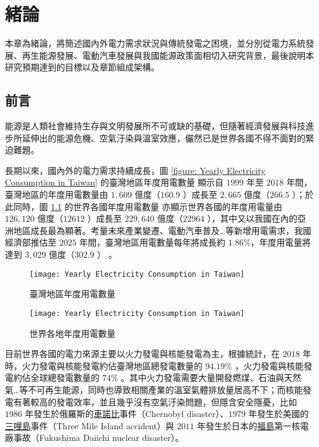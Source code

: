 
\chapter{緒論}

本章為緒論，將簡述國內外電力需求狀況與傳統發電之困境，並分別從電力系統發展、再生能源發展、電動汽車發展與我國能源政策面相切入研究背景，最後說明本研究預期達到的目標以及章節組成架構。

\section{前言}

能源是人類社會維持生存與文明發展所不可或缺的基礎，但隨著經濟發展與科技進步所延伸出的能源危機、空氣汙染與溫室效應，儼然已是世界各國不得不面對的緊迫難題。

長期以來，國內外的電力需求持續成長，圖 \ref{figure: Yearly Electricity Consumption in Taiwan} 的臺灣地區年度用電數量 \cite{boe-data} 顯示自 $1999$ 年至 $2018$ 年間，臺灣地區的年度用電數量由 $1,609$ 億度（$160.9$ \si{\TWh}）成長至 $2,665$ 億度（$266.5$ \si{\TWh}）；於此同時，圖 \ref{figure: Yearly Electricity Consumption over World} 的世界各國年度用電數量 \cite{enerdata-ec} 亦顯示世界各國的年度用電量由 $126,120$ 億度（$12612$ \si{\TWh}）成長至 $229,640$ 億度（$22964$ \si{\TWh}），其中又以我國在內的亞洲地區成長最為顯著。考量未來產業變遷、電動汽車普及…等新增用電需求，我國經濟部推估至 $2025$ 年間，臺灣地區用電數量每年將成長約 $1.86\%$，年度用電量將達到 $3,029$ 億度（$302.9$ \si{\TWh}） \cite{boe-107report}。

\begin{figure}[hbp]
  \centering
  \texttt{[image: Yearly Electricity Consumption in Taiwan]}
  \caption[臺灣地區年度用電量]{臺灣地區年度用電數量 \cite{boe-data}}
  \label{figure: Yearly Electricity Consumption in Taiwan}
  \texttt{[image: Yearly Electricity Consumption in Taiwan]}
  \caption[世界各地年度用電量]{世界各地年度用電數量 \cite{enerdata-ec}}
  \label{figure: Yearly Electricity Consumption over World}
\end{figure}

目前世界各國的電力來源主要以火力發電與核能發電為主，根據統計，在 $2018$ 年時，火力發電與核能發電約佔臺灣地區總發電數量的 $94.19\%$ \cite{boe-data}，火力發電與核能發電約佔全球總發電數量的 $74\%$ \cite{iea-wegs}。其中火力發電需要大量開發燃煤、石油與天然氣…等不可再生能源，同時也導致相關產業的溫室氣體排放量居高不下；而核能發電有著較高的發電效率，並且幾乎沒有空氣汙染問題，但隱含安全隱憂，比如 $1986$ 年發生於俄羅斯的\uline{車諾比}事件（Chernobyl disaster）、$1979$ 年發生於美國的\uline{三哩島}事件（Three Mile Island accident）與 $2011$ 年發生於日本的\uline{福島}第一核電廠事故（Fukushima Daiichi nuclear disaster）。

